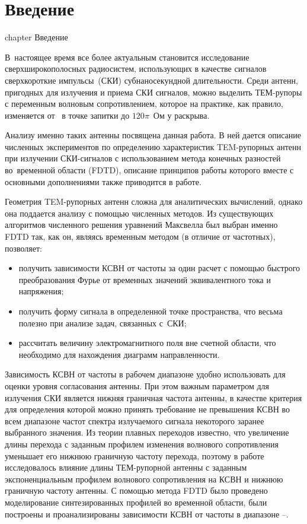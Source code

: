 %
%
%
\chapter* {Введение}
 {chapter} {Введение}

В~настоящее время все более актуальным становится исследование
сверхширокополосных радиосистем, использующих в качестве сигналов сверхкороткие
импульсы~(СКИ) субнаносекундной длительности. Среди антенн, пригодных для излучения
и приема СКИ сигналов, можно выделить ТЕМ-рупоры с переменным волновым
сопротивлением, которое на практике, как правило, изменяется от~
в точке запитки до $120\pi$~Ом у раскрыва.

Анализу именно таких антенны посвящена данная работа. В ней дается описание
численных экспериментов по определению характеристик TEM-рупорных
антенн при излучении СКИ-сигналов с использованием метода конечных разностей
во~временной области (FDTD), описание принципов работы которого вместе
с основными дополнениями также приводится в работе.

Геометрия TEM-рупорных антенн сложна для аналитических вычислений, однако она
поддается анализу с помощью численных методов. Из существующих алгоритмов
численного решения уравнений Максвелла был выбран именно FDTD так, как он,
являясь временным методом (в отличие от частотных), позволяет:
\begin{itemize}
\item получить зависимости КСВН от частоты за один расчет с помощью быстрого
      преобразования Фурье от временных значений эквивалентного тока
      и напряжения;
\item получить форму сигнала в определенной точке пространства, что весьма
      полезно при анализе задач, связанных с~СКИ;
\item рассчитать величину электромагнитного поля вне счетной области, что необходимо
      для нахождения диаграмм направленности.
\end{itemize}

Зависимость КСВН от частоты в рабочем диапазоне удобно использовать для оценки
уровня согласования антенны. При этом важным параметром для излучения СКИ
является нижняя граничная частота антенны, в качестве критерия для определения
которой можно принять требование не превышения КСВН во всем диапазоне частот
спектра излучаемого сигнала некоторого заранее выбранного значения.
Из теории плавных переходов известно, что
увеличение длины перехода с заданным профилем изменения волнового сопротивления
уменьшает его нижнюю граничную частоту перехода, поэтому в работе исследовалось
влияние длины ТЕМ-рупорной антенны с заданным экспоненциальным профилем
волнового сопротивления на КСВН и нижнюю граничную частоту антенны. С помощью
метода FDTD было проведено моделирование синтезированных профилей во временной
области, были построены и проанализированы зависимости КСВН от частоты
в диапазоне --.


